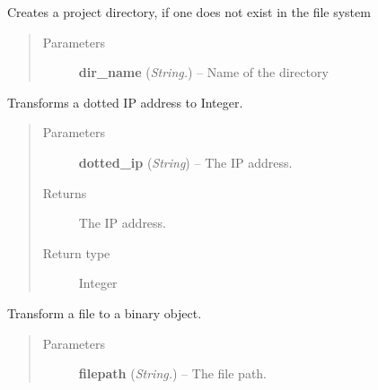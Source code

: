 \documentclass[letterpaper,10pt,english]{sphinxmanual}
\begin{document}

\begin{fulllineitems}
\label{api:utils.CreateProjectDir}
Creates a project directory, if one does not exist in the file system
\begin{quote}\begin{description}
\item[{Parameters}] \leavevmode
\textbf{dir\_name} (\emph{String.}) -- Name of the directory

\end{description}\end{quote}

\end{fulllineitems}


\begin{fulllineitems}
\label{api:utils.DottedIPToInt}
Transforms a dotted IP address to Integer.
\begin{quote}\begin{description}
\item[{Parameters}] \leavevmode
\textbf{dotted\_ip} (\emph{String}) -- The IP address.

\item[{Returns}] \leavevmode
The IP address.

\item[{Return type}] \leavevmode
Integer

\end{description}\end{quote}

\end{fulllineitems}


\begin{fulllineitems}
\label{api:utils.FileToBase64}
Transform a file to a binary object.
\begin{quote}\begin{description}
\item[{Parameters}] \leavevmode
\textbf{filepath} (\emph{String.}) -- The file path.

\end{description}\end{quote}

\end{fulllineitems}
\end{document}
